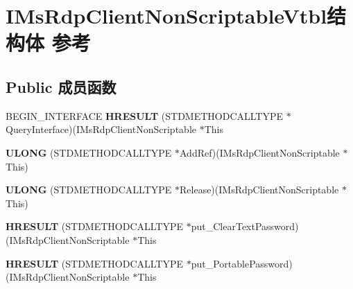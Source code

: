 \hypertarget{struct_i_ms_rdp_client_non_scriptable_vtbl}{}\section{I\+Ms\+Rdp\+Client\+Non\+Scriptable\+Vtbl结构体 参考}
\label{struct_i_ms_rdp_client_non_scriptable_vtbl}
\subsection*{Public 成员函数}
\begin{DoxyCompactItemize}
\item 
\mbox{\label{struct_i_ms_rdp_client_non_scriptable_vtbl_a06c0380c15367d12fe5e0be71d622de9}} 
B\+E\+G\+I\+N\+\_\+\+I\+N\+T\+E\+R\+F\+A\+CE {\bfseries H\+R\+E\+S\+U\+LT} (S\+T\+D\+M\+E\+T\+H\+O\+D\+C\+A\+L\+L\+T\+Y\+PE $\ast$Query\+Interface)(I\+Ms\+Rdp\+Client\+Non\+Scriptable $\ast$This
\item 
\mbox{\label{struct_i_ms_rdp_client_non_scriptable_vtbl_a0c8fce12e0cf0c6b86d3fb3410a88b90}} 
{\bfseries U\+L\+O\+NG} (S\+T\+D\+M\+E\+T\+H\+O\+D\+C\+A\+L\+L\+T\+Y\+PE $\ast$Add\+Ref)(I\+Ms\+Rdp\+Client\+Non\+Scriptable $\ast$This)
\item 
\mbox{\label{struct_i_ms_rdp_client_non_scriptable_vtbl_a2503ea20f3ddc586255f723dc64e3189}} 
{\bfseries U\+L\+O\+NG} (S\+T\+D\+M\+E\+T\+H\+O\+D\+C\+A\+L\+L\+T\+Y\+PE $\ast$Release)(I\+Ms\+Rdp\+Client\+Non\+Scriptable $\ast$This)
\item 
\mbox{\label{struct_i_ms_rdp_client_non_scriptable_vtbl_a47a2f7caf3d1c7f5d4ba1d4ba162d161}} 
{\bfseries H\+R\+E\+S\+U\+LT} (S\+T\+D\+M\+E\+T\+H\+O\+D\+C\+A\+L\+L\+T\+Y\+PE $\ast$put\+\_\+\+Clear\+Text\+Password)(I\+Ms\+Rdp\+Client\+Non\+Scriptable $\ast$This
\item 
\mbox{\label{struct_i_ms_rdp_client_non_scriptable_vtbl_a5128a57b56640bc04a95f0229738a1b4}} 
{\bfseries H\+R\+E\+S\+U\+LT} (S\+T\+D\+M\+E\+T\+H\+O\+D\+C\+A\+L\+L\+T\+Y\+PE $\ast$put\+\_\+\+Portable\+Password)(I\+Ms\+Rdp\+Client\+Non\+Scriptable $\ast$This

\end{DoxyCompactItemize}
